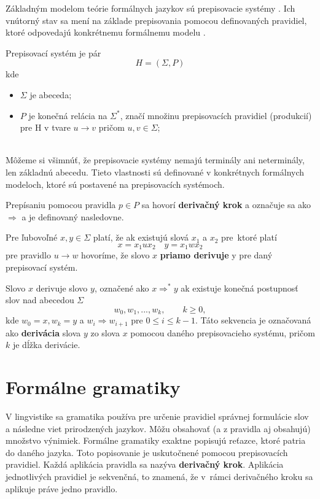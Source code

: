 Základným modelom teórie formálnych jazykov sú prepisovacie systémy \cite{salomaa}. Ich vnútorný stav sa mení na základe prepisovania pomocou definovaných pravidiel, ktoré odpovedajú konkrétnemu formálnemu modelu \cite{krivka}.

\begin{definition}
Prepisovací systém je pár 
\[H = (\Sigma, P)\]
kde
\begin{itemize}
    \itemsep0.2em 
    \item[] $ \Sigma $ je abeceda;
    \item[] $P$ je konečná relácia na $ \Sigma^* $, značí množinu prepisovacích pravidiel (produkcií) pre H v tvare $u \to v$ pričom $u, v \in \Sigma$;

\end{itemize}
\end{definition}
\hfill\\

Môžeme si všimnúť, že prepisovacie systémy nemajú terminály ani neterminály, len základnú abecedu. Tieto vlastnosti sú definované v konkrétnych formálnych modeloch, ktoré sú postavené na prepisovacích systémoch.

Prepísaniu pomocou pravidla $p \in P$ sa hovorí \textbf{derivačný krok} a označuje sa ako $\Rightarrow$ a je definovaný nasledovne.


\begin{definition}[Derivácia]
\label{derivation}
Pre ľubovoľné $x, y \in \Sigma$ platí, že ak existujú slová $x_1$ a $x_2$ pre~ktoré platí 
\[ x = x_{1}ux_{2} \quad y = x_{1}wx_{2} \]
pre pravidlo $u \to w$ hovoríme, že slovo $x$ \textbf{priamo derivuje} y pre daný prepisovací systém.

Slovo $x$ derivuje slovo $y$, označené ako $x \Rightarrow^* y$ ak existuje konečná postupnosť slov nad abecedou $\Sigma$
\[ w_0, w_1, ..., w_k, \quad\quad k \geq 0, \]
kde $w_0 = x, w_k = y$ a $w_i \Rightarrow w_{i+1}$ pre $0 \leq i \leq k-1$. Táto sekvencia je označovaná ako \textbf{derivácia} slova $y$ zo slova $x$ pomocou daného prepisovacieho systému, pričom $k$ je dĺžka derivácie.

\end{definition}


\section{Formálne gramatiky}
\label{grammar}
V lingvistike sa gramatika používa pre určenie pravidiel správnej formulácie slov a následne viet prirodzených jazykov. Môžu obsahovať (a z pravidla aj obsahujú) množstvo výnimiek. Formálne gramatiky exaktne popisujú reťazce, ktoré patria do daného jazyka. Toto popisovanie je uskutočnené pomocou prepisovacích pravidiel. Každá aplikácia pravidla sa nazýva \textbf{derivačný krok}. Aplikácia jednotlivých pravidiel je sekvenčná, to znamená, že v~rámci derivačného kroku sa aplikuje práve jedno pravidlo.

